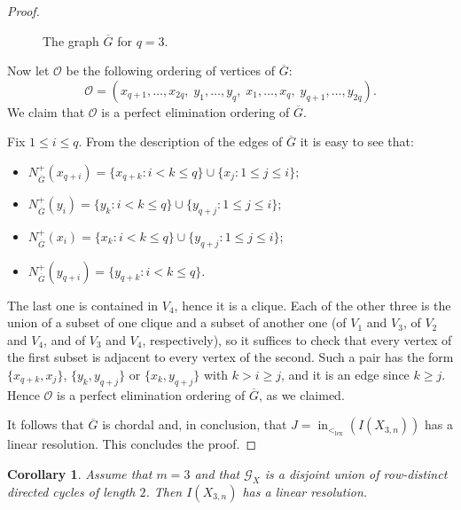 \documentclass[12pt]{amsart}
\numberwithin{equation}{section}
\newtheorem{Corollary}[Theorem]{Corollary}
\begin{document}
\begin{proof}
\begin{figure}[h]
\caption{The graph $\overline{G}$ for $q=3$.}
\label{Figure: complement graph}
\end{figure}

	Now let $\mathcal O$ be the following ordering of vertices of $\overline{G}$: 
    $$\mathcal{O}=(x_{q+1},\ldots,x_{2q},\;
		y_1,\ldots,y_q,\;
		x_1,\ldots,x_q,\;
		y_{q+1},\ldots,y_{2q}).$$ 
    We claim that $\mathcal{O}$ is a perfect elimination ordering of $\overline{G}$. 
	
	Fix $1\leq i\leq q$. From the description of the edges of $\overline{G}$ it is easy to see that:
    \begin{itemize}
        \item $
	N_{\overline{G}}^+(x_{q+i})
	=
	\{x_{q+k}:i<k\leq q\}
	\cup
	\{x_j:1\leq j\leq i\};$
    \item $N_{\overline{G}}^+(y_i)
	=
	\{y_k:i<k\leq q\}
	\cup
	\{y_{q+j}:1\leq j\leq i\};$
    \item $N_{\overline{G}}^+(x_i)
	=
	\{x_k:i<k\leq q\}
	\cup
	\{y_{q+j}:1\leq j\leq i\}$;
    \item $N_{\overline{G}}^+(y_{q+i})
	=
	\{y_{q+k}:i<k\leq q\}.$
    \end{itemize}
    The last
one is contained in $V_4$, hence it is a clique. Each of the other
three is the union of a subset of one clique and a subset of another
one (of $V_1$ and $V_3$, of $V_2$ and $V_4$, and of $V_3$ and $V_4$,
respectively), so it suffices to check that every vertex of the first
subset is adjacent to every vertex of the second. Such a pair has the
form $\{x_{q+k},x_j\}$, $\{y_k,y_{q+j}\}$ or $\{x_k,y_{q+j}\}$ with
$k>i\geq j$, and it is an edge since $k\geq j$.
Hence $\mathcal O$ is a perfect elimination ordering of
$\overline{G}$, as we claimed. 

It follows that $\overline{G}$ is chordal and, in conclusion, that $J=\operatorname{in}_{<_{\mathrm{lex}}}(I(X_{3,n}))$ has a linear resolution. This concludes the proof.
\end{proof}


    \begin{Corollary}\label{cor:m3-linear}
Assume that $m=3$ and that $\mathcal G_X$ is a disjoint union of
row-distinct directed cycles of length $2$. Then $I(X_{3,n})$ has a
linear resolution.
\end{Corollary}
\end{document}

